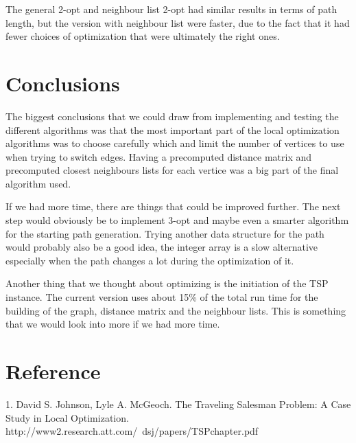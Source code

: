 \documentclass[article,11pt]{article}
\begin{document}
The general 2-opt and neighbour list 2-opt had similar results in
terms of path length, but the version with neighbour list were faster,
due to the fact that it had fewer choices of optimization that were
ultimately the right ones.
\section{Conclusions}
The biggest conclusions that we could draw from implementing and
testing the different algorithms was that the most important part of
the local optimization algorithms was to choose carefully which and
limit the number of vertices to use when trying to switch
edges. Having a precomputed distance matrix and precomputed  closest
neighbours lists for each vertice was a big part of the final
algorithm used.

If we had more time, there are things that could be improved
further. The next step would obviously be to implement 3-opt and maybe
even a smarter algorithm for the starting path generation. Trying
another data structure for the path would probably also be a good
idea, the integer array is a slow alternative especially when the path
changes a lot during the optimization of it.

Another thing that we thought about optimizing is the initiation of
the TSP instance. The current version uses about 15\% of the total run
time for the building of the graph, distance matrix and the neighbour
lists. This is something that we would look into more if we had more
time.
\section{Reference}
1. David S. Johnson, Lyle A. McGeoch. The Traveling Salesman Problem:
A Case Study in Local
Optimization. \\http://www2.research.att.com/~dsj/papers/TSPchapter.pdf
\end{document}
